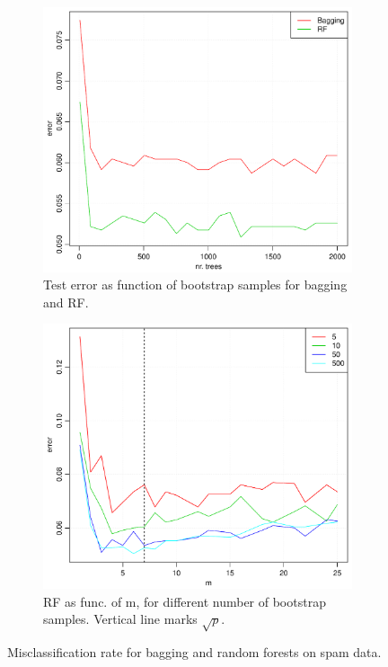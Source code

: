 \begin{figure}[h!]
  \centering
  \begin{subfigure}[b]{0.48\textwidth}
    \includegraphics[width=\textwidth]{./figures/baggingAndRFSpam.pdf}
    \caption{Test error as function of bootstrap samples for bagging and RF.}
    \label{fig:baggingAndRFSpam}
  \end{subfigure}%
  \quad
  \begin{subfigure}[b]{0.48\textwidth}
    \includegraphics[width=\textwidth]{./figures/RFSpam.pdf}
    \caption{RF as func. of m, for different number of bootstrap samples. Vertical line marks $\sqrt{p}$.}
    \label{fig:RFSpam}
  \end{subfigure}
  \vspace{1\baselineskip}
  \caption{Misclassification rate for bagging and random forests on spam data.}
  \label{fig:baggAndRF}
\end{figure}
